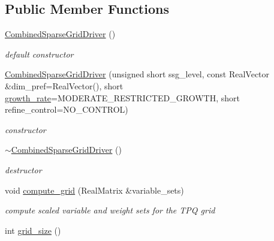 \subsection*{Public Member Functions}
\begin{DoxyCompactItemize}
\item 
\hyperlink{classPecos_1_1CombinedSparseGridDriver_a1a2f2942af7572d7cec131ac5a963742}{Combined\+Sparse\+Grid\+Driver} ()\label{classPecos_1_1CombinedSparseGridDriver_a1a2f2942af7572d7cec131ac5a963742}

\begin{DoxyCompactList}\small\item\em default constructor \end{DoxyCompactList}\item 
\hyperlink{classPecos_1_1CombinedSparseGridDriver_a88099e5082cd833f8eef69a82756e789}{Combined\+Sparse\+Grid\+Driver} (unsigned short ssg\+\_\+level, const Real\+Vector \&dim\+\_\+pref=Real\+Vector(), short \hyperlink{classPecos_1_1SparseGridDriver_a6f9061513ba25c62ee7a49b0d5da42cc}{growth\+\_\+rate}=M\+O\+D\+E\+R\+A\+T\+E\+\_\+\+R\+E\+S\+T\+R\+I\+C\+T\+E\+D\+\_\+\+G\+R\+O\+W\+TH, short refine\+\_\+control=N\+O\+\_\+\+C\+O\+N\+T\+R\+OL)\label{classPecos_1_1CombinedSparseGridDriver_a88099e5082cd833f8eef69a82756e789}

\begin{DoxyCompactList}\small\item\em constructor \end{DoxyCompactList}\item 
\hyperlink{classPecos_1_1CombinedSparseGridDriver_a4abc6da7da118b54bfb87d7b6af66584}{$\sim$\+Combined\+Sparse\+Grid\+Driver} ()\label{classPecos_1_1CombinedSparseGridDriver_a4abc6da7da118b54bfb87d7b6af66584}

\begin{DoxyCompactList}\small\item\em destructor \end{DoxyCompactList}\item 
void \hyperlink{classPecos_1_1CombinedSparseGridDriver_a66d564a1e3e1b33220a43d2e2629aace}{compute\+\_\+grid} (Real\+Matrix \&variable\+\_\+sets)\label{classPecos_1_1CombinedSparseGridDriver_a66d564a1e3e1b33220a43d2e2629aace}

\begin{DoxyCompactList}\small\item\em compute scaled variable and weight sets for the T\+PQ grid \end{DoxyCompactList}\item 
int \hyperlink{classPecos_1_1CombinedSparseGridDriver_a4b04c73f01f5eb9e6171305141eb1f73}{grid\+\_\+size} ()\label{classPecos_1_1CombinedSparseGridDriver_a4b04c73f01f5eb9e6171305141eb1f73}


\end{DoxyCompactItemize}
